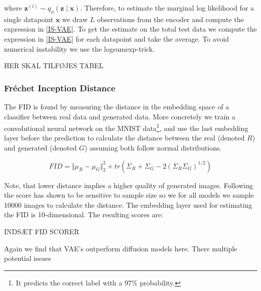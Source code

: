 \iffalse

\begin{align}
	\nonumber
	\log p_{\bm{\theta}}(\mathbf{x}) & = \log \int p_{\bm{\theta}}(\mathbf{x}, \mathbf{z})
	\frac{q_{\phi}(\mathbf{z} \mid \mathbf{x})}{q_{\phi}(\mathbf{z} \mid \mathbf{x})}
	d \mathbf{z}                                                                                        \\
	                                 & =
	\nonumber
	\log \mathbb{E}_{q_{\bm{\phi}}(\mathbf{z} \mid  \mathbf{x})} \left[
		\frac{
			p_{\bm{\theta}}(\mathbf{x}, \mathbf{z})
		}{q_{\phi}(\mathbf{z} \mid \mathbf{x})}
	\right]                                                                                             \\
	\label{IS-VAE}
	\Leftrightarrow
	\log p_{\bm{\theta}}(\mathbf{x}) & \approx
	\log \frac{1}{L} \sum_{l=1}^{L}
	\frac{
		p_{\bm{\theta}}(\mathbf{x} \mid  \mathbf{z}^{(l)}) p_{\bm{\theta}}(\mathbf{z})
	}{
		q_{\phi}(\mathbf{z}^{(l)} \mid \mathbf{x})
	}
\end{align}

\fi

where $\mathbf{z}^{(l)} \sim q_{\phi}(\mathbf{z} \mid \mathbf{x}) $. 
Therefore, to estimate the marginal log likelihood for a single datapoint $\mathbf{x}$
we draw $L$ observations from the encoder and compute the expression in \eqref{IS-VAE}.
To get the estimate on the total test data we compute the expression in \eqref{IS-VAE} 
for each datapoint and take the average. 
To avoid numerical instability we use the logsumexp-trick.


HER SKAL TILFØJES TABEL 


\subsubsection*{Fréchet Inception Distance}

The FID is found by measuring the distance in the embedding space of a classifier between real data and generated data. More concretely we train a convolutional neural network on the MNIST data\footnote{It predicts the correct label with a $97\%$ probability.}, and use the last embedding layer before the prediction to calculate the distance between the real (denoted $R$) and generated (denoted $G$) assuming both follow normal distributions. 

\begin{equation}
    FID = \Vert \mu_R - \mu_G \Vert_2^2 + tr(\Sigma_R + \Sigma_G - 2 (\Sigma_R \Sigma_G)^{1/2})
\end{equation}

Note, that lower distance implies a higher quality of generated images. Following \cite[p. 775]{pml2Book} the score has shown to be sensitive to sample size so we for all models we sample 10000 images to calculate the distance. The embedding layer used for estimating the FID is 10-dimensional. The resulting scores are:

INDSÆT FID SCORER

Again we find that VAE's outperform diffusion models here. There multiple potential issues 